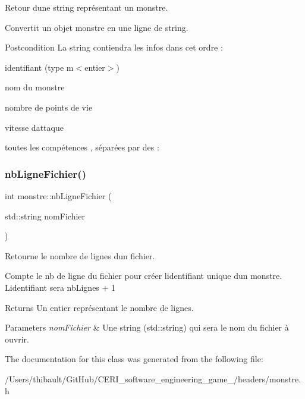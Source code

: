 Retour d\textquotesingle{}une string représentant un monstre. 

Convertit un objet monstre en une ligne de string. \begin{DoxyPostcond}{Postcondition}
La string contiendra les infos dans cet ordre \+:
\begin{DoxyItemize}
\item identifiant (type {\ttfamily m$<$entier$>$})
\item nom du monstre
\item nombre de points de vie
\item vitesse d\textquotesingle{}attaque
\item toutes les compétences , séparées par des {\ttfamily \+:} 
\end{DoxyItemize}
\end{DoxyPostcond}
\mbox{\label{classmonstre_a7591cd207cd1bee68ca79ce489f41ce2}} 
\subsubsection{\texorpdfstring{nb\+Ligne\+Fichier()}{nbLigneFichier()}}
{\footnotesize\ttfamily int monstre\+::nb\+Ligne\+Fichier (\begin{DoxyParamCaption}\item[{std\+::string}]{nom\+Fichier }\end{DoxyParamCaption})}



Retourne le nombre de lignes d\textquotesingle{}un fichier. 

Compte le nb de ligne du fichier pour créer l\textquotesingle{}identifiant unique d\textquotesingle{}un monstre. L\textquotesingle{}identifiant sera {\ttfamily  nb\+Lignes + 1 } \begin{DoxyReturn}{Returns}
Un entier représentant le nombre de lignes. 
\end{DoxyReturn}

\begin{DoxyParams}{Parameters}
{\em nom\+Fichier} & Une string (std\+::string) qui sera le nom du fichier à ouvrir. \\
\hline
\end{DoxyParams}


The documentation for this class was generated from the following file\+:\begin{DoxyCompactItemize}
\item 
/\+Users/thibault/\+Git\+Hub/\+C\+E\+R\+I\+\_\+software\+\_\+engineering\+\_\+game\+\_/headers/monstre.\+h\end{DoxyCompactItemize}
